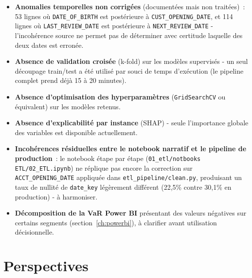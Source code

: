 \documentclass[11pt,a4paper]{report}
\begin{document}
\begin{itemize}
\item \textbf{Anomalies temporelles non corrig\'ees} (document\'ees mais non
      trait\'ees)~: 53 lignes o\`u \texttt{DATE\_OF\_BIRTH} est post\'erieure \`a
      \texttt{CUST\_OPENING\_DATE}, et 114 lignes o\`u
      \texttt{LAST\_REVIEW\_DATE} est post\'erieure \`a
      \texttt{NEXT\_REVIEW\_DATE} - l'incoh\'erence source ne permet pas de
      d\'eterminer avec certitude laquelle des deux dates est erron\'ee.
\item \textbf{Absence de validation crois\'ee} (k-fold) sur les mod\`eles
      supervis\'es - un seul d\'ecoupage train/test a \'et\'e utilis\'e par souci
      de temps d'ex\'ecution (le pipeline complet prend d\'ej\`a 15 \`a 20
      minutes).
\item \textbf{Absence d'optimisation des hyperparam\`etres}
      (\texttt{GridSearchCV} ou \'equivalent) sur les mod\`eles retenus.
\item \textbf{Absence d'explicabilit\'e par instance} (SHAP) - seule
      l'importance globale des variables est disponible actuellement.
\item \textbf{Incoh\'erences r\'esiduelles entre le notebook narratif et le
      pipeline de production}~: le notebook \'etape par étape
      (\texttt{01\_etl/notbooks ETL/02\_ETL.ipynb}) ne r\'eplique pas encore la
      correction sur \texttt{ACCT\_OPENING\_DATE} appliqu\'ee dans
      \texttt{etl\_pipeline/clean.py}, produisant un taux de nullit\'e de
      \texttt{date\_key} l\'eg\`erement diff\'erent (22,5\% contre 30,1\% en
      production) - \`a harmoniser.
\item \textbf{D\'ecomposition de la VaR Power BI} pr\'esentant des valeurs
      n\'egatives sur certains segments (section~\ref{ch:powerbi}), \`a
      clarifier avant utilisation d\'ecisionnelle.
\end{itemize}

\section{Perspectives}
\end{document}
